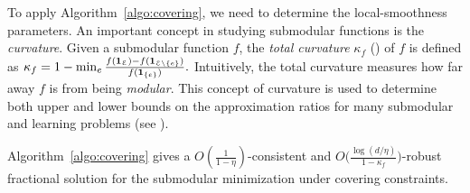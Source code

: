 To apply Algorithm~\ref{algo:covering}, we need to determine the local-smoothness parameters.
An important concept in studying submodular functions is the \emph{curvature}. Given a submodular
function $f$, the \emph{total curvature} $\kappa_{f}$ (\cite{ConfortiCornuejols84:Submodular-set-functions}) of $f$ is defined as
$
\kappa_{f} = 1 - \min_{e} \frac{f(\mathbf{1}_{\mathcal{E}}) - f(\mathbf{1}_{\mathcal{E} \setminus \{e\}})}{f(\mathbf{1}_{\{e\}})}.
$
Intuitively, the total curvature measures how far away $f$ is from being \emph{modular}. This concept of
curvature is used to determine both upper and lower bounds on the approximation ratios
for many submodular and learning problems (see \cite{ConfortiCornuejols84:Submodular-set-functions,GoemansHarvey09:Approximating-submodular,BalcanHarvey12:Learning-Submodular,Vondrak10:Submodularity-and-Curvature:,IyerJegelka13:Curvature-and-optimal,SviridenkoVondrak17:Optimal-approximation}).

\begin{proposition}
Algorithm~\ref{algo:covering} gives a
$O(\frac{1}{1 - \eta})$-consistent and $O\bigl( \frac{\log (d/\eta)}{1 - \kappa_{f}} \bigr)$-robust fractional  solution
for the submodular minimization under covering constraints.
\end{proposition}

